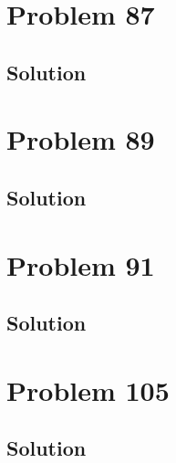 \documentclass[12pt]{article}
\begin{document}
    \pagebreak
    \section{Problem 87}

        \subsection{Solution}

    \pagebreak
    \section{Problem 89}

        \subsection{Solution}

    \pagebreak
    \section{Problem 91}

        \subsection{Solution}

    \pagebreak
    \section{Problem 105}

        \subsection{Solution}

    \pagebreak
    \tableofcontents
\end{document}
